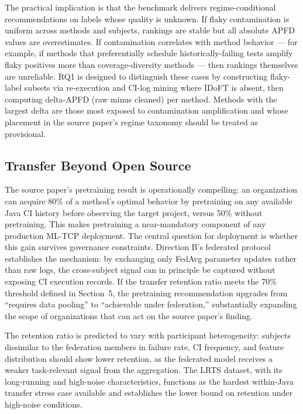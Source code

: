 \documentclass[conference]{IEEEtran}
\begin{document}
The practical implication is that the benchmark delivers regime-conditional recommendations on labels whose quality is unknown. If flaky contamination is uniform across methods and subjects, rankings are stable but all absolute APFD values are overestimates. If contamination correlates with method behavior — for example, if methods that preferentially schedule historically-failing tests amplify flaky positives more than coverage-diversity methods — then rankings themselves are unreliable. RQ1 is designed to distinguish these cases by constructing flaky-label subsets via re-execution and CI-log mining where IDoFT is absent, then computing delta-APFD (raw minus cleaned) per method. Methods with the largest delta are those most exposed to contamination amplification and whose placement in the source paper's regime taxonomy should be treated as provisional.


\subsection{Transfer Beyond Open Source}

The source paper's pretraining result is operationally compelling: an organization can acquire 80\% of a method's optimal behavior by pretraining on any available Java CI history before observing the target project, versus 50\% without pretraining. This makes pretraining a near-mandatory component of any production ML-TCP deployment. The central question for deployment is whether this gain survives governance constraints. Direction B's federated protocol establishes the mechanism: by exchanging only FedAvg parameter updates rather than raw logs, the cross-subject signal can in principle be captured without exposing CI execution records. If the transfer retention ratio meets the 70\% threshold defined in Section~5, the pretraining recommendation upgrades from ``requires data pooling'' to ``achievable under federation,'' substantially expanding the scope of organizations that can act on the source paper's finding.

The retention ratio is predicted to vary with participant heterogeneity: subjects dissimilar to the federation members in failure rate, CI frequency, and feature distribution should show lower retention, as the federated model receives a weaker task-relevant signal from the aggregation. The LRTS dataset, with its long-running and high-noise characteristics, functions as the hardest within-Java transfer stress case available and establishes the lower bound on retention under high-noise conditions.
\end{document}
